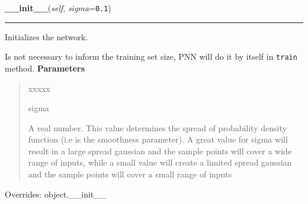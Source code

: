     \vspace{0.5ex}

\hspace{.8\funcindent}\begin{boxedminipage}{\funcwidth}

    \raggedright \textbf{\_\_init\_\_}(\textit{self}, \textit{sigma}={\tt 0.1})

    \vspace{-1.5ex}

    \rule{\textwidth}{0.5\fboxrule}
\setlength{\parskip}{2ex}

Initializes the network.

Is not necessary to inform the training set size, PNN will do it by
itself in \texttt{train} method.
\setlength{\parskip}{1ex}
      \textbf{Parameters}
      \vspace{-1ex}

      \begin{quote}
        \begin{Ventry}{xxxxx}

          \item[sigma]


A real number. This value determines the spread of probability
density function (i.e is the smoothness parameter). A great value
for sigma will result in a large spread gaussian and the sample
points will cover a wide range of inputs, while a small value will
create a limited spread gaussian and the sample points will cover a
small range of inputs
        \end{Ventry}

      \end{quote}

      Overrides: object.\_\_init\_\_

    \end{boxedminipage}

    \label{peach:nn:nnet:PNN:train}

    \vspace{0.5ex}

